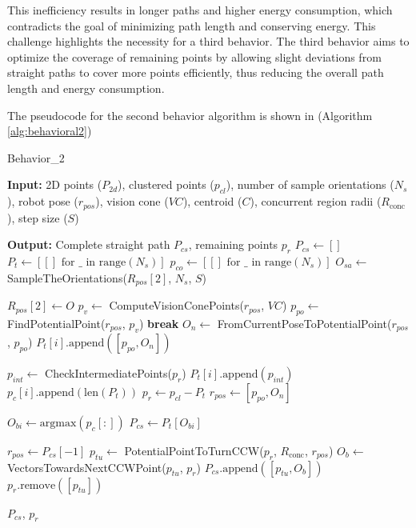 \vspace*{6mm}   

This inefficiency results in longer paths and higher energy consumption, which contradicts the goal of minimizing path length and conserving energy. This challenge highlights the necessity for a third behavior. The third behavior aims to optimize the coverage of remaining points by allowing slight deviations from straight paths to cover more points efficiently, thus reducing the overall path length and energy consumption.

\vspace*{6mm}   

The pseudocode for the second behavior algorithm is shown in (Algorithm \autoref{alg:behavioral2})

\begin{algorithm}[H]
    \caption{Behavior\_2}
    \label{alg:behavioral2}
    \begin{algorithmic}[1]

    \Statex \textbf{Input:} 2D points ($P_{2d}$), clustered points ($p_{cl}$), number of sample orientations ($N_s$), robot pose ($r_{pos}$), vision cone ($VC$), centroid ($C$), concurrent region radii ($R_{\text{conc}}$), step size ($S$)

    \Statex \textbf{Output:} Complete straight path $P_{cs}$, remaining points $p_r$
    \newline
    \State $P_{cs} \leftarrow []$
    \State $P_t \leftarrow [[] \text{ for } \_ \text{ in range}(N_s)]$
    \State $p_{co} \leftarrow [[] \text{ for } \_ \text{ in range}(N_s)]$
    \State $O_{sa} \leftarrow$ SampleTheOrientations($R_{pos}[2]$, $N_s$, $S$)
    
        \State $R_{pos}[2] \leftarrow O$
            \State $p_v \leftarrow$ ComputeVisionConePoints($r_{pos}$, $VC$)
            \State $p_{po} \leftarrow$ FindPotentialPoint($r_{pos}$, $p_v$)
                \State \textbf{break}
            \EndIf
            \State $O_n \leftarrow$ FromCurrentPoseToPotentialPoint($r_{pos}$, $p_{po}$)
            \State $P_t[i].\text{append}([p_{po}, O_n])$
            
            \State $p_{int} \leftarrow$ CheckIntermediatePoints($p_r$)
            \State $P_t[i].\text{append}(p_{int})$
            \State $p_c[i].\text{append}(\text{len}(P_t))$
            \State $p_r \leftarrow p_{cl} - P_t$
            \State $r_{pos} \leftarrow [p_{po}, O_n]$
        \EndWhile
    \EndFor
    
    \State $O_{bi} \leftarrow \text{argmax}(p_c[:])$
    \State $P_{cs} \leftarrow P_t[O_{bi}]$
    
    \State $r_{pos} \leftarrow P_{cs}[-1]$
    \State $p_{tu} \leftarrow$ PotentialPointToTurnCCW($p_r$, $R_{\text{conc}}$, $r_{pos}$)
    \State $O_b \leftarrow$ VectorsTowardsNextCCWPoint($p_{tu}$, $p_r$)
    \State $P_{cs}.\text{append}([p_{tu}, O_b])$
    \State $p_r.\text{remove}([p_{tu}])$

    \State \Return $P_{cs}$, $p_r$
    \end{algorithmic}
    \end{algorithm}
    


